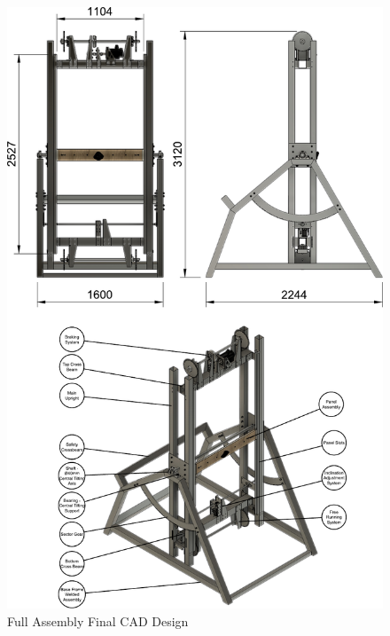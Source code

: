 \begin{figure}[ht]
    \centering
    \includegraphics[width=0.9\linewidth]{figs/final_design/Main_Assembly_CAD.pdf}
    \caption{Full Assembly Final CAD Design}
    \label{fig:full-assembly-final-design}
\end{figure}

